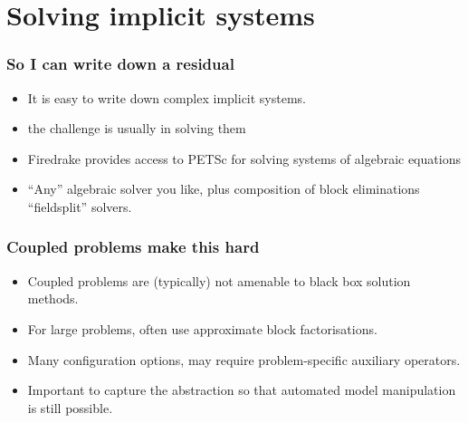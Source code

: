 \documentclass[presentation]{beamer}
\begin{document}
\section{Solving implicit systems}

\begin{frame}
  \frametitle{So I can write down a residual}
  \begin{itemize}
  \item It is easy to write down complex implicit systems.
  \item the challenge is usually in solving them
  \item Firedrake provides access to PETSc for solving systems of
    algebraic equations
  \item ``Any'' algebraic solver you like, plus composition of block
    eliminations ``fieldsplit'' solvers.
  \end{itemize}
\end{frame}

\begin{frame}
  \frametitle{Coupled problems make this hard}
  \begin{itemize}
  \item Coupled problems are (typically) not amenable to black box solution
    methods.
  \item For large problems, often use approximate block factorisations.
  \item Many configuration options, may require problem-specific
    auxiliary operators.
  \item Important to capture the abstraction so that automated model
    manipulation is still possible.
  \end{itemize}
\end{frame}
\end{document}

